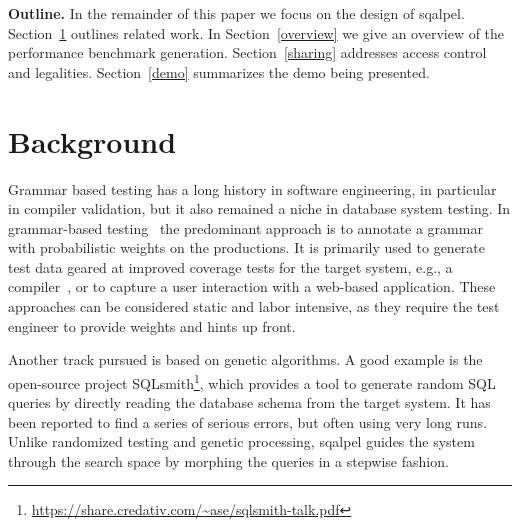 \documentclass{cidr-2019}
\begin{document}
{\bf Outline.} In the remainder of this paper we focus on the design
of {\sc sqalpel}. Section~\ref{Background} outlines related work. In
Section~\ref{overview} we give an overview of the performance
benchmark generation. Section~\ref{sharing} addresses access control
and legalities. Section~\ref{demo} summarizes the demo being
presented.


\section{Background}\label{Background}


Grammar based testing has a long history in software engineering, in
particular in compiler validation, but it also remained a niche in
database system testing. In grammar-based
testing~\cite{10.1007/11754008_2,ZAMLI20111741} the predominant
approach is to annotate a grammar with probabilistic weights on the
productions. It is primarily used to generate test data geared at
improved coverage tests for the target system,
e.g., a compiler~\cite{10.1007/978-3-642-41707-8_2}, or to capture a user
interaction with a web-based application. These approaches can be
considered static and labor intensive, as they require the test
engineer to provide weights and hints up front.

Another track pursued is based on genetic algorithms. A good example
is the open-source project
SQLsmith\footnote{\url{https://share.credativ.com/~ase/sqlsmith-talk.pdf}},
which provides a tool to generate random SQL queries by directly
reading the database schema from the target system. It has been
reported to find a series of serious errors, but often using very long
runs. Unlike randomized testing and genetic processing, {\sc sqalpel} guides the
system through the search space by morphing the queries in a stepwise
fashion.
\end{document}
